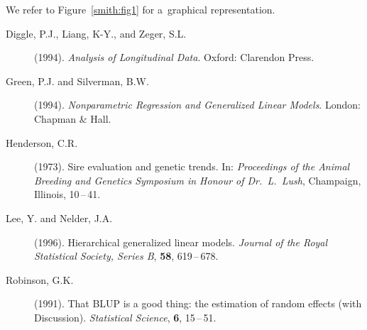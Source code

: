 \documentclass[twoside]{report}
\begin{document}
We refer to Figure~\ref{smith:fig1} for a~graphical representation.






\begin{description}
\item[Diggle, P.J., Liang, K-Y., and Zeger, S.L.] (1994).
     {\it Analysis of Longitudinal Data}.
     Oxford: Clarendon Press.
\item[Green, P.J. and Silverman, B.W.] (1994).
     {\it Nonparametric Regression and Generalized Linear Models}.
     London: Chapman \& Hall.
\item[Henderson, C.R.] (1973).
     Sire evaluation and genetic trends.
     In: {\it Proceedings of the Animal Breeding and Genetics Symposium in
     Honour of Dr.\ L.\ Lush}, Champaign, Illinois, 10\,--\,41.
\item[Lee, Y. and Nelder, J.A.] (1996).
     Hierarchical generalized linear models.
     {\it Journal of the Royal Statistical Society, Series B}, {\bf 58},
      619\,--\,678.
\item[Robinson, G.K.] (1991).
     That BLUP is a good thing: the estimation of random effects (with Discussion).
     {\it Statistical Science}, {\bf 6}, 15\,--\,51.
\end{description}
\end{document}
